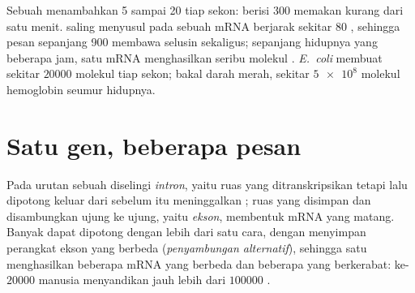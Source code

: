 \begin{example}\label{ex:g11:gene-expression:speed}
Sebuah  menambahkan 5 sampai 20  tiap sekon: 
berisi 300  memakan kurang dari satu menit.  saling
menyusul pada sebuah mRNA berjarak sekitar 80 , sehingga
pesan sepanjang 900  membawa selusin  sekaligus;
sepanjang hidupnya yang beberapa jam, satu mRNA menghasilkan seribu
molekul .  \emph{E.~coli} membuat sekitar $\num{20000}$
molekul  tiap sekon; bakal  darah merah, sekitar
$\num{5e8}$ molekul hemoglobin seumur hidupnya.
\end{example}

\section{Satu gen, beberapa pesan}

\begin{proposition}\label{prop:g11:gene-expression:splicing}
Pada  urutan sebuah  diselingi
\emph{intron}, yaitu ruas yang ditranskripsikan tetapi
lalu dipotong keluar dari  sebelum  itu meninggalkan ; ruas yang disimpan dan disambungkan ujung ke ujung, yaitu
\emph{ekson}, membentuk mRNA yang matang. Banyak  dapat dipotong
dengan lebih dari satu cara, dengan menyimpan perangkat ekson yang
berbeda (\emph{penyambungan alternatif}), sehingga satu  menghasilkan
beberapa mRNA yang berbeda dan beberapa  yang berkerabat:
ke-$\num{20000}$  manusia menyandikan jauh lebih dari
$\num{100000}$ .
\end{proposition}
\admitted

